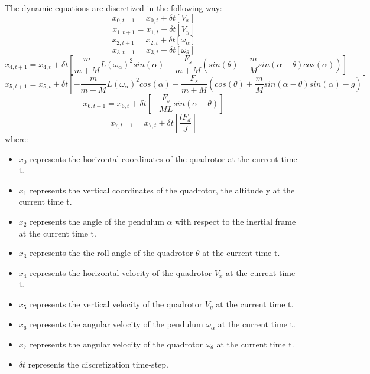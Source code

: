 \documentclass[a4paper,11pt,oneside]{book}
\begin{document}
The dynamic equations are discretized in the following way:
\begin{equation}
     x_{0,t+1}=x_{0,t}+\delta t[V_{x}]
\end{equation}
\begin{equation}
     x_{1,t+1}=x_{1,t}+\delta t[V_{y}]
\end{equation}
\begin{equation}
     x_{2,t+1}=x_{2,t}+\delta t[\omega_{\alpha}]
\end{equation}
\begin{equation}
     x_{3,t+1}=x_{3,t}+\delta t[\omega_{\theta}]
\end{equation}
\begin{equation}
     x_{4,t+1}=x_{4,t}+\delta t[\frac{m}{m+M}L(\omega_{\alpha})^{2}sin(\alpha)-\frac{F_{s}}{m+M}(sin(\theta)-\frac{m}{M}sin(\alpha-\theta)cos(\alpha))]
\end{equation}
\begin{equation}
     x_{5,t+1}=x_{5,t}+\delta t[-\frac{m}{m+M}L(\omega_{\alpha})^{2}cos(\alpha)+\frac{F_{s}}{m+M}(cos(\theta)+\frac{m}{M}sin(\alpha - \theta)sin(\alpha)-g)]
\end{equation}
\begin{equation}
     x_{6,t+1}=x_{6,t}+\delta t[-\frac{F_{s}}{ML}sin(\alpha - \theta)]
\end{equation}
\begin{equation}
     x_{7,t+1}=x_{7,t}+\delta t[\frac{lF_{d}}{J}]
\end{equation}
where:
\begin{itemize}
     \item[] $x_{0}$ represents the horizontal coordinates of the quadrotor at the current time t.
     \item[] $x_{1}$ represents the vertical coordinates of the quadrotor, the altitude y at the current time t.
     \item[] $x_{2}$ represents the angle of the pendulum $\alpha$ with respect to the inertial frame at the current time t.
     \item[] $x_{3}$ represents the the roll angle of the quadrotor $\theta$ at the current time t.
     \item[] $x_{4}$ represents the horizontal velocity of the quadrotor $V_{x}$ at the current time t.
     \item[] $x_{5}$ represents the vertical velocity of the quadrotor $V_{y}$ at the current time t.
     \item[] $x_{6}$ represents the angular velocity of the pendulum $\omega_{\alpha}$ at the current time t.
     \item[] $x_{7}$ represents the angular velocity of the quadrotor $\omega_{\theta}$ at the current time t.
     \item[] $\delta t$ represents the discretization time-step.
\end{itemize}
\end{document}

